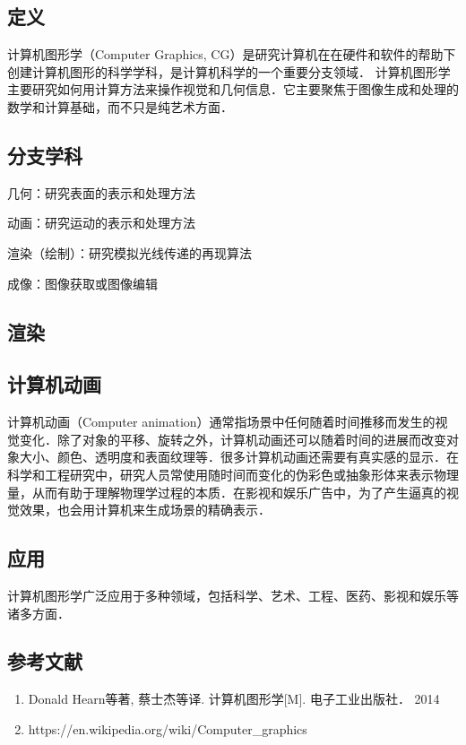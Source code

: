 
\subsection{定义}
计算机图形学（Computer Graphics, CG）是研究计算机在在硬件和软件的帮助下创建计算机图形的科学学科，是计算机科学的一个重要分支领域．
计算机图形学主要研究如何用计算方法来操作视觉和几何信息．它主要聚焦于图像生成和处理的数学和计算基础，而不只是纯艺术方面．

\subsection{分支学科}
几何：研究表面的表示和处理方法

动画：研究运动的表示和处理方法

渲染（绘制）：研究模拟光线传递的再现算法

成像：图像获取或图像编辑


\subsection{渲染}




\subsection{计算机动画}
计算机动画（Computer animation）通常指场景中任何随着时间推移而发生的视觉变化．除了对象的平移、旋转之外，计算机动画还可以随着时间的进展而改变对象大小、颜色、透明度和表面纹理等．很多计算机动画还需要有真实感的显示．在科学和工程研究中，研究人员常使用随时间而变化的伪彩色或抽象形体来表示物理量，从而有助于理解物理学过程的本质．在影视和娱乐广告中，为了产生逼真的视觉效果，也会用计算机来生成场景的精确表示．


\subsection{应用}
计算机图形学广泛应用于多种领域，包括科学、艺术、工程、医药、影视和娱乐等诸多方面．


\subsection{参考文献}
\begin{enumerate}
\item Donald Hearn等著, 蔡士杰等译. 计算机图形学[M]. 电子工业出版社． 2014
\item https://en.wikipedia.org/wiki/Computer_graphics
\end{enumerate}